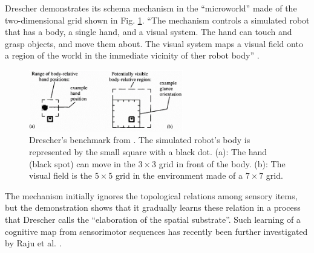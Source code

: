 \documentclass[runningheads]{llncs}
\begin{document}



Drescher demonstrates its schema mechanism in the ``microworld'' made of the two-dimensional grid shown in Fig. \ref{fig:drescher2}.
``The mechanism controls a simulated robot that has a body, a single hand, and a visual system. 
The hand can touch and grasp objects, and move them about.
The visual system maps a visual field onto a region of the world in the immediate vicinity of ther robot body'' \cite[p. 114]{drescher_made-up_1991}. 

\begin{figure}
	\centering
	\includegraphics[width=0.6\textwidth]{Figure_drescher_expe.png}
	\caption{Drescher's benchmark from \cite[Fig. 6.1]{drescher_made-up_1991}. The simulated robot's body is represented by the small square with a black dot. 
		(a): The hand (black spot) can move in the $3 \times 3$ grid in front of the body.
		(b): The visual field is the $5 \times 5$ grid in the environment made of a $7 \times 7$ grid.} 
	\label{fig:drescher2}
\end{figure}

The mechanism initially ignores the topological relations among sensory items, but the demonstration shows that it gradually learns these relation in a process that Drescher calls the ``elaboration of the spatial substrate''. 
Such learning of a cognitive map from sensorimotor sequences has recently been further investigated by Raju et al. \cite{raju_space_2022}.
\end{document}
